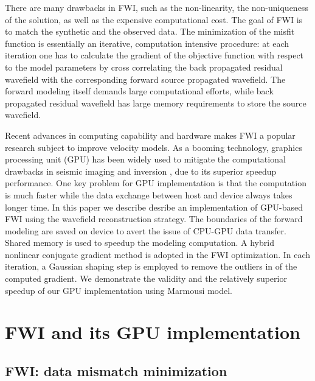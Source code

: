 There are many drawbacks in FWI, such as the non-linearity, the non-uniqueness of the solution, as well as the expensive computational cost. The goal of FWI is to match the synthetic and the observed data.
The minimization of the misfit function is essentially an iterative, computation intensive procedure: at each iteration one has to calculate the gradient of the objective function with respect to the model parameters by cross correlating the back propagated residual wavefield with the corresponding forward source propagated wavefield. The forward modeling itself demands large computational efforts, while back propagated residual wavefield has large memory requirements to store the source wavefield. 

Recent advances in computing capability and hardware makes FWI a popular research subject to improve velocity models. As a booming technology, graphics processing unit (GPU) has been widely used to mitigate the computational drawbacks in seismic imaging \citep{micikevicius20093d,Yang201464} and inversion \citep{boonyasiriwat2010multisource,shin20143d}, due to its superior speedup performance. 
One key problem for GPU implementation is that the computation is much faster while the data exchange between host and device always takes longer time.  In this paper we describe desribe an implementation of  GPU-based FWI using the wavefield reconstruction strategy. The boundaries of the forward modeling are saved on device to avert the issue of CPU-GPU data transfer. Shared memory is used to speedup the modeling computation. A hybrid nonlinear conjugate gradient method is adopted in the FWI optimization.  In each iteration, a Gaussian shaping step is employed to remove the outliers in of the computed gradient. We demonstrate the validity and the relatively superior speedup of our GPU implementation using Marmousi model.


\section{FWI and its GPU implementation}

\subsection{FWI: data mismatch minimization}

